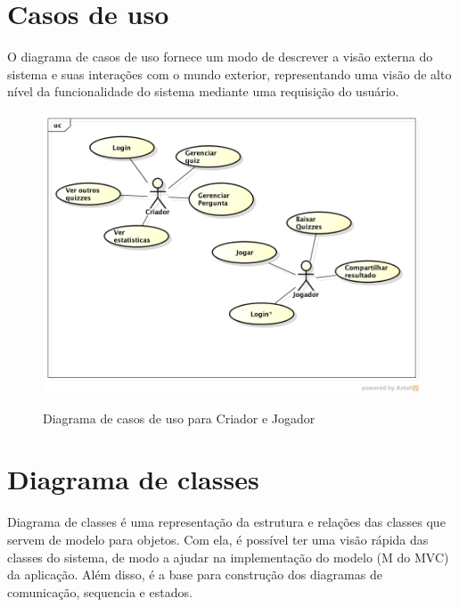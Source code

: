 \section{Casos de uso}
O diagrama de casos de uso fornece um modo de descrever a visão externa do sistema e suas interações com o mundo exterior, representando uma visão de alto nível da funcionalidade do sistema mediante uma requisição do usuário.
 
\begin{figure}[H]
  \centering
  \includegraphics[scale =0.6]{figs/casos_de_uso.png}\\
  \caption{ Diagrama de casos de uso para Criador e Jogador }
  \label{FIG:Form_Factor}
\end{figure} 
 
 
\section{Diagrama de classes}
 
	Diagrama de classes é uma representação da estrutura e relações das classes que servem de modelo para objetos. Com ela, é possível ter uma visão rápida das classes do sistema, de modo a ajudar na implementação do modelo (M do \ac{MVC}) da aplicação. Além disso, é a base para construção dos diagramas de comunicação, sequencia e estados.

